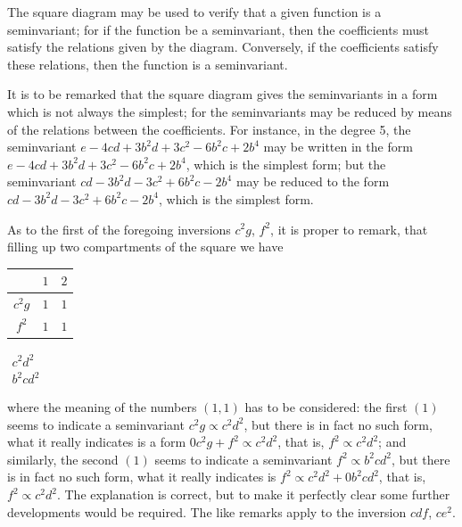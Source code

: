 \documentclass[11pt,a4paper]{book}
\begin{document}
\setcounter{art}{45}
\begin{art}
The square diagram may be used to verify that a given function is a seminvariant; for if the function be a seminvariant, then the coefficients must satisfy the relations given by the diagram. Conversely, if the coefficients satisfy these relations, then the function is a seminvariant.
\end{art}

\setcounter{art}{46}
\begin{art}
It is to be remarked that the square diagram gives the seminvariants in a form which is not always the simplest; for the seminvariants may be reduced by means of the relations between the coefficients. For instance, in the degree 5, the seminvariant $e - 4cd + 3b^{2}d + 3c^{2} - 6b^{2}c + 2b^{4}$ may be written in the form $e - 4cd + 3b^{2}d + 3c^{2} - 6b^{2}c + 2b^{4}$, which is the simplest form; but the seminvariant $cd - 3b^{2}d - 3c^{2} + 6b^{2}c - 2b^{4}$ may be reduced to the form $cd - 3b^{2}d - 3c^{2} + 6b^{2}c - 2b^{4}$, which is the simplest form.
\end{art}

\setcounter{art}{47}
\begin{art}
As to the first of the foregoing inversions $c^{2}g$, $f^{2}$, it is proper to remark, that filling up two compartments of the square we have
\begin{center}
\begin{tabular}{c|cc}
 & $1$ & $2$ \\
\hline
$c^{2}g$ & $1$ & $1$ \\
$f^{2}$ & $1$ & $1$ \\
\end{tabular}
\quad
$\begin{array}{c}c^{2}d^{2}\\ b^{2}cd^{2}\end{array}$
\end{center}
where the meaning of the numbers $(1, 1)$ has to be considered: the first $(1)$ seems to indicate a seminvariant $c^{2}g \propto c^{2}d^{2}$, but there is in fact no such form, what it really indicates is a form $0c^{2}g + f^{2} \propto c^{2}d^{2}$, that is, $f^{2} \propto c^{2}d^{2}$; and similarly, the second $(1)$ seems to indicate a seminvariant $f^{2} \propto b^{2}cd^{2}$, but there is in fact no such form, what it really indicates is $f^{2} \propto c^{2}d^{2} + 0b^{2}cd^{2}$, that is, $f^{2} \propto c^{2}d^{2}$. The explanation is correct, but to make it perfectly clear some further developments would be required. The like remarks apply to the inversion $cdf$, $ce^{2}$.
\end{art}
\end{document}
